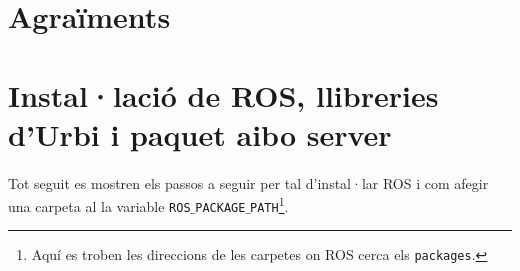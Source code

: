 \documentclass[12pt,a4paper,final,twoside]{article}
\begin{document}




\newpage
\section*{Agraïments}

\newpage

\label{Referencies}




\appendix
\clearpage %
\addappheadtotoc
\appendixpage

\section{Instal·lació de ROS, llibreries d'Urbi i paquet aibo server}

\paragraph{}Tot seguit es mostren els passos a seguir per tal d'instal·lar ROS i com afegir una carpeta al la variable \texttt{ROS$\_$PACKAGE$\_$PATH}\footnote{Aquí es troben les direccions de les carpetes on ROS cerca els \texttt{packages}.}.
\end{document}
